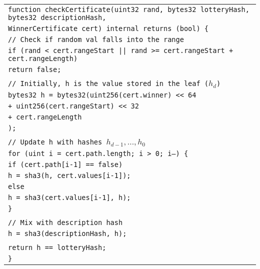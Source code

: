 \documentclass[a4paper]{article}
\begin{document}
    \begin{center}
        \begin{tabular}{l}
            \texttt{function checkCertificate(uint32 rand, bytes32 lotteryHash, bytes32 descriptionHash, }\\
            \qquad\qquad\qquad\qquad\qquad\qquad\qquad \texttt{WinnerCertificate cert) internal returns (bool) \{ }\\
            \qquad \texttt{// Check if~random val falls into~the~range}\\
            \qquad \texttt{if (rand < cert.rangeStart || rand >= cert.rangeStart + cert.rangeLength)}\\
            \qquad\qquad \texttt{return false;}\\
            \\
            \qquad\texttt{// Initially, h is~the~value stored in~the~leaf ($h_d$)}\\
            \qquad \texttt{bytes32 h = bytes32(uint256(cert.winner) << 64}\\
            \qquad\qquad\qquad\qquad \texttt{+ uint256(cert.rangeStart) << 32}\\
            \qquad\qquad\qquad\qquad \texttt{+ cert.rangeLength}\\
            \qquad\qquad\qquad\qquad \texttt{);}\\
            \\
            \qquad \texttt{// Update h with~hashes $h_{d-1}, \ldots, h_0$}\\
            \qquad\texttt{for (uint i = cert.path.length; i > 0; i--) \{}\\
            \qquad\qquad \texttt{if (cert.path[i-1] == false)}\\
            \qquad\qquad\qquad \texttt{h = sha3(h, cert.values[i-1]);}\\
            \qquad\qquad \texttt{else}\\
            \qquad\qquad\qquad\texttt{h = sha3(cert.values[i-1], h);}\\
            \qquad\texttt{\}}\\
            \\
            \qquad\texttt{// Mix with~description hash}\\
            \qquad\texttt{h = sha3(descriptionHash, h);}\\
            \\
            \qquad\texttt{return h == lotteryHash;}\\
            \texttt{\}}
        \end{tabular}
    \end{center}
\end{document}
